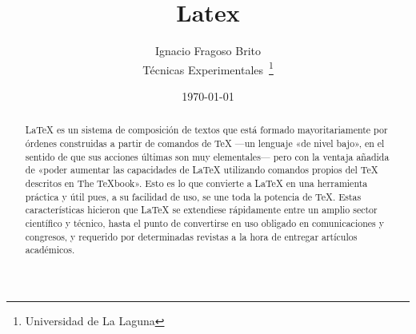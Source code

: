 \documentclass[a4paper,12pt]{article}
\begin{document}
\title{Latex}
\author{Ignacio Fragoso Brito\\
	Técnicas Experimentales~\footnote{Universidad de La Laguna}
	}
\date{\today}
\maketitle

\begin{abstract}
  LaTeX es un sistema de composición de textos que está formado mayoritariamente
  por órdenes construidas a partir de comandos de TeX —un lenguaje «de nivel bajo», 
  en el sentido de que sus acciones últimas son muy elementales— 
  pero con la ventaja añadida de «poder aumentar las capacidades de LaTeX utilizando
  comandos propios del TeX descritos en The TeXbook».
  Esto es lo que convierte a LaTeX en una herramienta práctica y útil pues, a su facilidad de uso,
  se une toda la potencia de TeX. Estas características hicieron que LaTeX se extendiese rápidamente
  entre un amplio sector científico y técnico, hasta el punto de convertirse en uso obligado en comunicaciones
  y congresos, y requerido por determinadas revistas a la hora de entregar artículos académicos.
\end{abstract}
\end{document}
